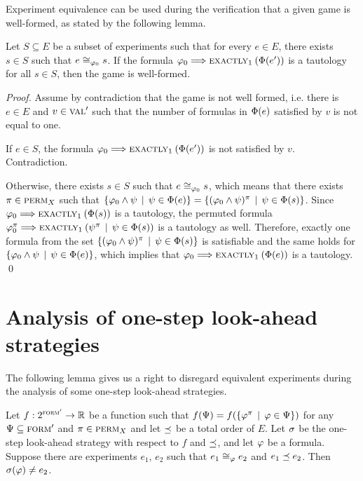 Experiment equivalence can be used during the verification
  that a given game is well-formed, as stated by the following lemma.

\begin{lemma} \label{lma:well-formed}
  Let $S\subseteq E$ be a subset of experiments
  such that for every $e\in E$, there exists $s\in S$
   such that $e\cong_{\varphi_0}s$.
  If the formula $\varphi_0 ==> \textsc{exactly}_{1}\:(\Phi(e'))$ is a tautology for
  all $s\in S$, then the game is well-formed.
\end{lemma}

\begin{proof}
Assume by contradiction that the game is not well formed, i.e.
  there is $e\in E$ and $v \in \textsc{val}'$ such that the number of
  formulas in $\Phi(e)$ satisfied by $v$ is not equal to one.

If $e\in S$, the formula $\varphi_0 ==> \textsc{exactly}_{1}\:(\Phi(e'))$ is not
  satisfied by $v$. Contradiction.

Otherwise, there exists $s\in S$ such that $e\cong_{\varphi_0}s$, which means that
  there exists $\pi\in\textsc{perm}_X$ such that
$\{ \varphi_0\wedge\psi \:\:|\:\: \psi\in\Phi(e) \} =
 \{ (\varphi_0\wedge\psi)^\pi \:\:|\:\: \psi\in\Phi(s) \}$.
Since $\varphi_0 ==> \textsc{exactly}_{1}\:(\Phi(s))$ is a tautology,
  the permuted formula
  $\varphi_0^\pi ==> \textsc{exactly}_{1}\:(\psi^\pi \:\:|\:\: \psi\in\Phi(s))$
  is a tautology as well.
Therefore, exactly one formula from the set
 $ \{ (\varphi_0\wedge\psi)^\pi \:\:|\:\: \psi\in\Phi(s) \}$
 is satisfiable and the same holds for
  $\{ \varphi_0\wedge\psi \:\:|\:\: \psi\in\Phi(e) \}$,
 which implies that
 $\varphi_0 ==> \textsc{exactly}_{1}\:(\Phi(e))$
 is a tautology. \qed
\end{proof}

\section{Analysis of one-step look-ahead strategies}

The following lemma gives us a right to disregard equivalent experiments
  during the analysis of some one-step look-ahead strategies.

\begin{lemma}
Let $f: 2^{\textsc{form}'} ->\mathbb{R}$ be a function such that
  $f(\Psi) = f(\{\varphi^\pi \:\:|\:\: \varphi\in\Psi\})$ for any
  $\Psi\subseteq{\textsc{form}'}$ and $\pi\in\textsc{perm}_X$ and
  let $\preceq$ be a total order of $E$.
Let $\sigma$ be the one-step look-ahead strategy with respect to $f$ and $\preceq$, and
let $\varphi$ be a formula.
Suppose there are experiments $e_1$, $e_2$ such that $e_1\cong_{\varphi}e_2$ and $e_1\preceq e_2$.
Then $\sigma(\varphi) \not= e_2$.
\end{lemma}

